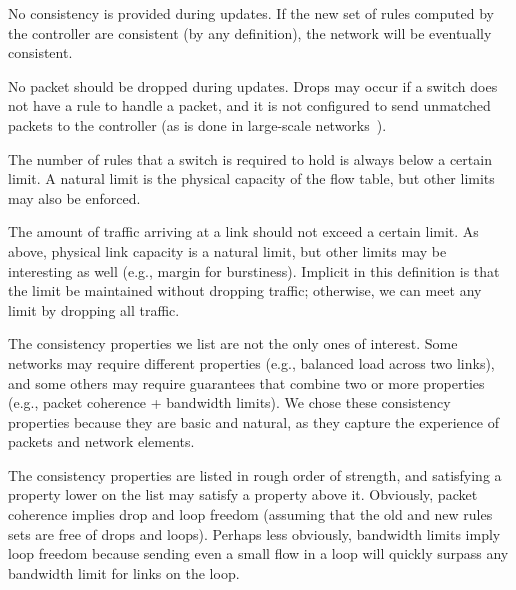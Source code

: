  No consistency is provided during updates. If the new set of rules computed by the controller are consistent (by any definition), the network will be eventually consistent.

 No packet should be dropped during updates. Drops may occur if a switch does not have a rule to handle a packet, and it is not configured to send unmatched packets to the controller (as is done in large-scale networks~\cite{swan,b4}).



 The number of rules that a switch is required to hold is always below a certain limit. A natural limit is the physical capacity of the flow table, but other limits may also be enforced.

 The amount of traffic arriving at a link should not exceed a certain limit. As above, physical link capacity is a natural limit, but other limits may be interesting as well (e.g., margin for burstiness). Implicit in this definition is that the limit be maintained without dropping traffic; otherwise, we can meet any limit by dropping all traffic.

The consistency properties we list are not the only ones of interest.
Some networks may require different properties (e.g., balanced load across two links), and some others may require  guarantees that combine two or more properties (e.g., packet coherence + bandwidth limits). We chose these consistency properties because they are basic and natural, as they capture the experience of packets and network elements.

The consistency properties are listed in rough order of strength, and satisfying a property lower on the list may satisfy a property above it. Obviously, packet coherence implies drop and loop freedom (assuming that the old and new rules sets are free of drops and loops). Perhaps less obviously, bandwidth limits imply loop freedom because sending even a small flow in a loop will quickly surpass any bandwidth limit for links on the loop.

